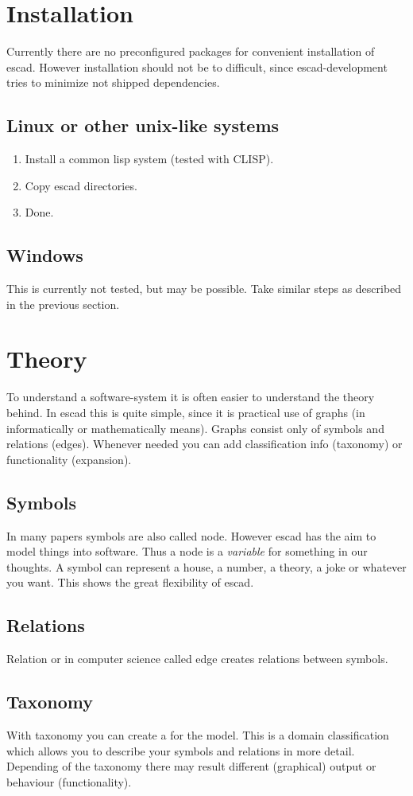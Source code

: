 \documentclass[a4paper, 12pt, openany]{scrbook}
\begin{document}
\chapter{Installation}
Currently there are no preconfigured packages for convenient installation of escad. However installation should not be to difficult, since escad-development tries to minimize not shipped dependencies.
\section{Linux or other unix-like systems}
\begin{enumerate}
\item Install a common lisp system (tested with CLISP).
\item Copy escad directories.
\item Done.
\end{enumerate}
\section{Windows}
This is currently not tested, but may be possible. Take similar steps as described in the previous section.
\chapter{Theory}
To understand a software-system it is often easier to understand the theory behind. In escad this is quite simple, since it is practical use of graphs (in informatically or mathematically means). Graphs consist only of symbols and relations (edges). Whenever needed you can add classification info (taxonomy) or functionality (expansion).
\section{Symbols}
In many papers symbols are also called node. However escad has the aim to model things into software. Thus a node is a \emph{variable} for something in our thoughts. A symbol can represent a house, a number, a theory, a joke or whatever you want. This shows the great flexibility of escad.
\section{Relations}
Relation or in computer science called edge creates relations between symbols.
\section{Taxonomy}
With taxonomy you can create a  for the model. This is a domain classification which allows you to describe your symbols and relations in more detail. Depending of the taxonomy there may result different (graphical) output or behaviour (functionality).
\end{document}
